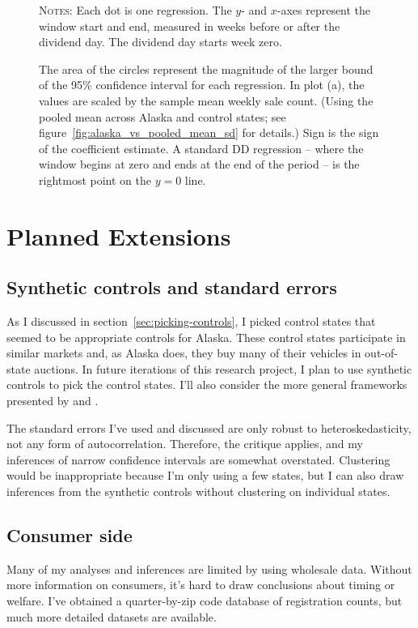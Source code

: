\documentclass[11pt,letterpaper,oneside]{article}
\newcommand{\varWindowDDnotes}{%
Each dot is one regression.
The $y$- and $x$-axes represent the window start and end, measured in weeks before or after the dividend day.
The dividend day starts week zero.

 The area of the circles represent the magnitude of the larger bound of the 95\% confidence interval for each regression.
In plot (a), the values are scaled by the sample mean weekly sale count.
(Using the pooled mean across Alaska and control states; see figure~\ref{fig:alaska_vs_pooled_mean_sd} for details.)
Sign is the sign of the coefficient estimate. %
A standard DD regression -- where the window begins at zero and ends at the end of the period -- is the rightmost point on the $y=0$ line.
}
\begin{document}
\begin{doublespacing}
\begin{figure}[!hbtp]
    {\footnotesize
    \textsc{Notes:}
    \varWindowDDnotes
    }
\end{figure}


\section{Planned Extensions}

\subsection{Synthetic controls and standard errors}
\label{sec:synthetic-controls}
As I discussed in section~\ref{sec:picking-controls},  I picked control states that seemed to be appropriate controls for Alaska.
These control states participate in similar markets and, as Alaska does, they buy many of their vehicles in out\hyp{}of\hyp{}state auctions.
In future iterations of this research project, I plan to use synthetic controls to pick the control states.
I'll also consider the more general frameworks presented by
\textcite{DoudchenkoImbens2016DD} and \textcite{Xu2016}.

The standard errors I've used and discussed are only robust to heteroskedasticity, not any form of autocorrelation.
Therefore, the \textcite{bertrand_duflo2004DD} critique applies, and my inferences of narrow confidence intervals are somewhat overstated.
Clustering would be inappropriate because I'm only using a few states, but I can also draw inferences from the synthetic controls without clustering on individual states.
%


\subsection{Consumer side}
Many of my analyses and inferences are limited by using wholesale data.
Without more information on consumers, it's hard to draw conclusions about timing or welfare.
I've obtained a quarter\hyp{}by\hyp{}zip code database of registration counts, but much more detailed datasets are available.
%

\end{doublespacing}
\end{document}

